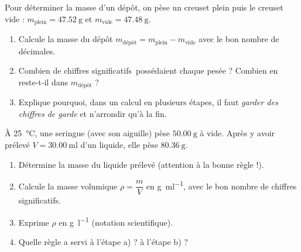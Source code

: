 \documentclass[11pt,a4paper]{article}
\newcommand{\CS}{chiffres significatifs}
\begin{document}
\begin{exo}
Pour déterminer la masse d'un dépôt, on pèse un creuset plein puis le creuset vide :
$m_{\text{plein}} = \qty{47,52}{\gram}$ et $m_{\text{vide}} = \qty{47,48}{\gram}$.
\begin{enumerate}[label=\alph*),leftmargin=1.6em,itemsep=1pt]
  \item Calcule la masse du dépôt $m_{\text{dépôt}} = m_{\text{plein}} - m_{\text{vide}}$ avec le bon
        nombre de décimales.
  \item Combien de \CS\ possédaient chaque pesée ? Combien en reste-t-il dans $m_{\text{dépôt}}$ ?
  \item Explique pourquoi, dans un calcul en plusieurs étapes, il faut \emph{garder des chiffres de
        garde} et n'arrondir qu'à la fin.
\end{enumerate}
\end{exo}

\begin{exo}
À \qty{25}{\celsius}, une seringue (avec son aiguille) pèse $\qty{50,00}{\gram}$ à vide. Après y avoir
prélevé $V = \qty{30,00}{\milli\litre}$ d'un liquide, elle pèse $\qty{80,36}{\gram}$.
\begin{enumerate}[label=\alph*),leftmargin=1.6em,itemsep=1pt]
  \item Détermine la masse du liquide prélevé (attention à la bonne règle !).
  \item Calcule la masse volumique $\rho = \dfrac{m}{V}$ en \si{\gram\per\milli\litre}, avec le bon
        nombre de \CS.
  \item Exprime $\rho$ en \si{\gram\per\litre} (notation scientifique).
  \item Quelle règle a servi à l'étape a) ? à l'étape b) ?
\end{enumerate}
\end{exo}
\end{document}

